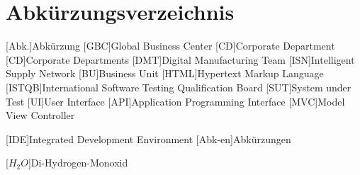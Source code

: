 
\chapter*{Abkürzungsverzeichnis}                   %

\begin{acronym}[DHBW]
 [Abk.]{Abkürzung}
 [GBC]{Global Business Center}
 [CD]{Corporate Department}
 [CD]{Corporate Departments}
 [DMT]{Digital Manufacturing Team}
 [ISN]{Intelligent Supply Network}
 [BU]{Business Unit}
 [HTML]{Hypertext Markup Language}
 [ISTQB]{International Software Testing Qualification Board}
 [SUT]{System under Test}
 [UI]{User Interface}
 [API]{Application Programming Interface}
 [MVC]{Model View Controller}

 [IDE]{Integrated Development Environment}
 [Abk-en]{Abkürzungen}

 [\ensuremath{H_2O}]{Di-Hydrogen-Monoxid}

\end{acronym}
